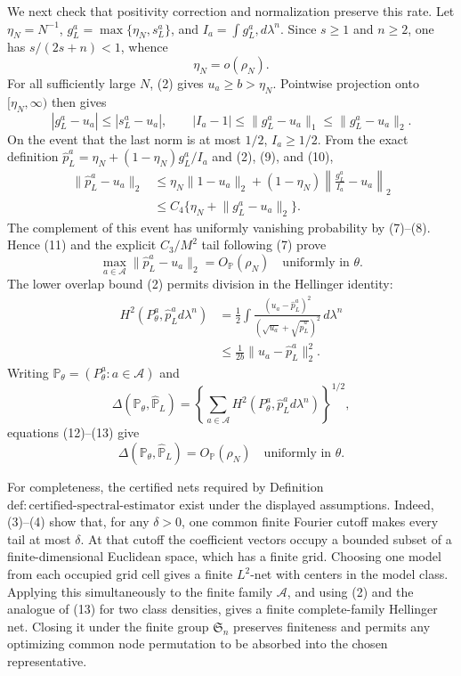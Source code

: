 We next check that positivity correction and normalization preserve this rate.  Let \(\eta_N=N^{-1}\), \(g_L^a=\max\{\eta_N,s_L^a\}\), and \(I_a=\int g_L^a,d\lambda^n\).  Since \(s\geq1\) and \(n\geq2\), one has \(s/(2s+n)<1\), whence
\[
 \eta_N=o(\rho_N).
\tag{9}
\]
For all sufficiently large \(N\), (2) gives \(u_a\geq b>\eta_N\).  Pointwise projection onto \([\eta_N,\infty)\) then gives
\[
 |g_L^a-u_a|\leq|s_L^a-u_a|,
 \qquad
 |I_a-1|\leq\lVert g_L^a-u_a\rVert_1
 \leq\lVert g_L^a-u_a\rVert_2.
\tag{10}
\]
On the event that the last norm is at most \(1/2\), \(I_a\geq1/2\).  From the exact definition
\(
 \widehat p_L^a=\eta_N+(1-\eta_N)g_L^a/I_a
\)
and (2), (9), and (10),
\[
\begin{aligned}
 \lVert\widehat p_L^a-u_a\rVert_2
 &\leq \eta_N\lVert1-u_a\rVert_2
 +(1-\eta_N)\left\lVert\frac{g_L^a}{I_a}-u_a\right\rVert_2\\
 &\leq C_4\{\eta_N+\lVert g_L^a-u_a\rVert_2\}.
\end{aligned}
\tag{11}
\]
The complement of this event has uniformly vanishing probability by (7)--(8).  Hence (11) and the explicit \(C_3/M^2\) tail following (7) prove
\[
 \max_{a\in\mathcal A}\lVert\widehat p_L^a-u_a\rVert_2
 =O_{\mathbb P}(\rho_N)
\quad\text{uniformly in }\theta.
\tag{12}
\]
The lower overlap bound (2) permits division in the Hellinger identity:
\[
\begin{aligned}
 H^2(P_\theta^a,\widehat p_L^a d\lambda^n)
 &=\frac12\int
 \frac{(u_a-\widehat p_L^a)^2}
 {(\sqrt{u_a}+\sqrt{\widehat p_L^a})^2}\,d\lambda^n\\
 &\leq\frac1{2b}\lVert u_a-\widehat p_L^a\rVert_2^2.
\end{aligned}
\tag{13}
\]
Writing \(\mathbb P_\theta=(P_\theta^a:a\in\mathcal A)\) and
\[
 \Delta(\mathbb P_\theta,\widehat{\mathbb P}_L)
 =\left\{\sum_{a\in\mathcal A}
 H^2(P_\theta^a,\widehat p_L^a d\lambda^n)\right\}^{1/2},
\]
equations (12)--(13) give
\[
 \Delta(\mathbb P_\theta,\widehat{\mathbb P}_L)
 =O_{\mathbb P}(\rho_N)
\quad\text{uniformly in }\theta.
\tag{14}
\]

For completeness, the certified nets required by Definition \(\mathrm{def:certified\text{-}spectral\text{-}estimator}\) exist under the displayed assumptions.  Indeed, (3)--(4) show that, for any \(\delta>0\), one common finite Fourier cutoff makes every tail at most \(\delta\).  At that cutoff the coefficient vectors occupy a bounded subset of a finite-dimensional Euclidean space, which has a finite grid.  Choosing one model from each occupied grid cell gives a finite \(L^2\)-net with centers in the model class.  Applying this simultaneously to the finite family \(\mathcal A\), and using (2) and the analogue of (13) for two class densities, gives a finite complete-family Hellinger net.  Closing it under the finite group \(\mathfrak S_n\) preserves finiteness and permits any optimizing common node permutation to be absorbed into the chosen representative.

